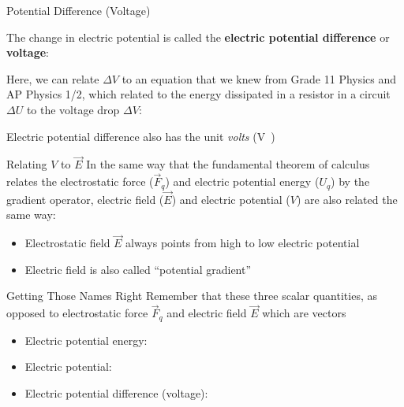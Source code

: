 \documentclass[12pt,aspectratio=169]{beamer}
\begin{document}
\begin{frame}{Potential Difference (Voltage)}

  The change in electric potential is called the
  \textbf{electric potential difference} or \textbf{voltage}:


  Here, we can relate $\Delta V$ to an equation that we knew from Grade 11
  Physics and AP Physics 1/2, which related to the energy dissipated in a
  resistor in a circuit $\Delta U$ to the voltage drop $\Delta V$:
    

  Electric potential difference also has the unit \emph{volts} (\si\volt)
\end{frame}



\begin{frame}{Relating $V$ to $\vec E$}
  In the same way that the fundamental theorem of calculus relates the 
  electrostatic force ($\vec F_q$) and electric potential energy ($U_q$) by the
  gradient operator, electric field ($\vec E$) and electric potential ($V$) are
  also related the same way:

  \begin{itemize}
  \item Electrostatic field $\vec E$ always points from high to low electric
    potential
  \item Electric field is also called ``potential gradient''
  \end{itemize}
\end{frame}




\begin{frame}{Getting Those Names Right}
  Remember that these three scalar quantities, as opposed to electrostatic
  force $\vec F_q$ and electric field $\vec E$ which are vectors
  \begin{itemize}
  \item Electric potential energy:
    
  \item Electric potential:

  \item Electric potential difference (voltage):

  \end{itemize}
\end{frame}
\end{document}
